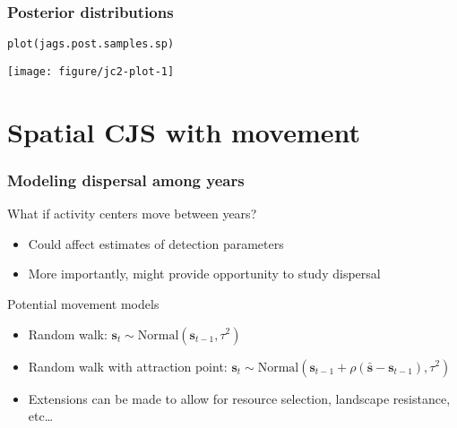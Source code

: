 \documentclass[color=usenames,dvipsnames]{beamer}\usepackage[]{graphicx}\usepackage[]{color}
\makeatletter
\newcommand{\hlstd}[1]{\textcolor[rgb]{0,0,0}{#1}}%
\newcommand{\hlkwd}[1]{\textcolor[rgb]{0.004,0.004,0.506}{#1}}%
\newenvironment{kframe}{%
 \def\at@end@of@kframe{}%
 \ifinner\ifhmode%
  \def\at@end@of@kframe{\end{minipage}}%
  \begin{minipage}{\columnwidth}%
 \fi\fi%
 \def\FrameCommand##1{\hskip\@totalleftmargin \hskip-\fboxsep
 \colorbox{shadecolor}{##1}\hskip-\fboxsep
     \hskip-\linewidth \hskip-\@totalleftmargin \hskip\columnwidth}%
 \MakeFramed {\advance\hsize-\width
   \@totalleftmargin\z@ \linewidth\hsize
   \@setminipage}}%
 {\par\unskip\endMakeFramed%
 \at@end@of@kframe}
\newenvironment{knitrout}{}{} %
\makeatother
\begin{document}
\begin{frame}[fragile]
  \frametitle{Posterior distributions}
\begin{knitrout}\scriptsize
{}\color{fgcolor}\begin{kframe}
\begin{alltt}
\hlkwd{plot}\hlstd{(jags.post.samples.sp)}
\end{alltt}
\end{kframe}

{\centering \texttt{[image: figure/jc2-plot-1]} 

}



\end{knitrout}
\end{frame}










\section{Spatial CJS with movement}









\begin{frame}
  \frametitle{Modeling dispersal among years}
  {\large What if activity centers move between years?}
  \begin{itemize}
    \normalsize
    \item Could affect estimates of detection parameters
    \item More importantly, might provide opportunity to study dispersal
  \end{itemize}
  \pause
  \vfill
  {\large Potential movement models}
  \begin{itemize}
    \normalsize
    \item Random walk: ${\bm s}_t \sim \mbox{Normal}({\bm s}_{t-1}, \tau^2)$
    \item Random walk with attraction point: ${\bm s}_t \sim \mbox{Normal}({\bm  s}_{t-1} + \rho(\bar{\bm s} - {\bm s}_{t-1}), \tau^2)$
    \item Extensions can be made to allow for resource selection,
      landscape resistance, etc\dots 
  \end{itemize}
\end{frame}
\end{document}
